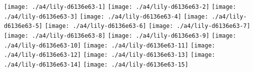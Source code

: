 \texttt{[image: ./a4/lily-d6136e63-1]}%
\ifx\betweenLilyPondSystem \undefined
  \linebreak
\else
  \expandafter{}%
\fi
\texttt{[image: ./a4/lily-d6136e63-2]}%
\ifx\betweenLilyPondSystem \undefined
  \linebreak
\else
  \expandafter{}%
\fi
\texttt{[image: ./a4/lily-d6136e63-3]}%
\ifx\betweenLilyPondSystem \undefined
  \linebreak
\else
  \expandafter{}%
\fi
\texttt{[image: ./a4/lily-d6136e63-4]}%
\ifx\betweenLilyPondSystem \undefined
  \linebreak
\else
  \expandafter{}%
\fi
\texttt{[image: ./a4/lily-d6136e63-5]}%
\ifx\betweenLilyPondSystem \undefined
  \linebreak
\else
  \expandafter{}%
\fi
\texttt{[image: ./a4/lily-d6136e63-6]}%
\ifx\betweenLilyPondSystem \undefined
  \linebreak
\else
  \expandafter{}%
\fi
\texttt{[image: ./a4/lily-d6136e63-7]}%
\ifx\betweenLilyPondSystem \undefined
  \linebreak
\else
  \expandafter{}%
\fi
\texttt{[image: ./a4/lily-d6136e63-8]}%
\ifx\betweenLilyPondSystem \undefined
  \linebreak
\else
  \expandafter{}%
\fi
\texttt{[image: ./a4/lily-d6136e63-9]}%
\ifx\betweenLilyPondSystem \undefined
  \linebreak
\else
  \expandafter{}%
\fi
\texttt{[image: ./a4/lily-d6136e63-10]}%
\ifx\betweenLilyPondSystem \undefined
  \linebreak
\else
  \expandafter{}%
\fi
\texttt{[image: ./a4/lily-d6136e63-11]}%
\ifx\betweenLilyPondSystem \undefined
  \linebreak
\else
  \expandafter{}%
\fi
\texttt{[image: ./a4/lily-d6136e63-12]}%
\ifx\betweenLilyPondSystem \undefined
  \linebreak
\else
  \expandafter{}%
\fi
\texttt{[image: ./a4/lily-d6136e63-13]}%
\ifx\betweenLilyPondSystem \undefined
  \linebreak
\else
  \expandafter{}%
\fi
\texttt{[image: ./a4/lily-d6136e63-14]}%
\ifx\betweenLilyPondSystem \undefined
  \linebreak
\else
  \expandafter{}%
\fi
\texttt{[image: ./a4/lily-d6136e63-15]}%
\ifx\betweenLilyPondSystem \undefined
